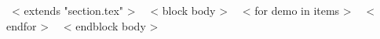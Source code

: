 \vspace{5mm}
~< extends "section.tex" >~
~< block body >~
~< for demo in items >~
~< endfor >~
~< endblock body >~
